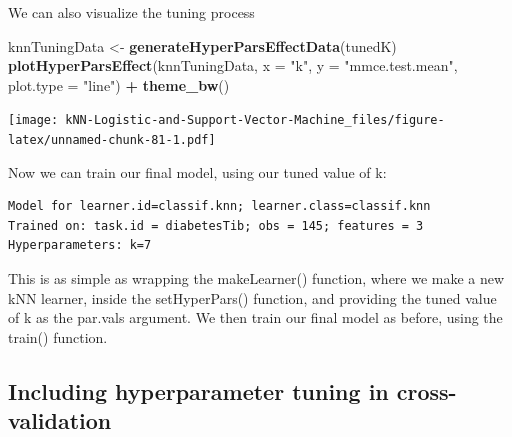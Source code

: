 \documentclass[
]{article}
\newenvironment{Shaded}{\begin{snugshade}}{\end{snugshade}}
\newcommand{\AttributeTok}[1]{\textcolor[rgb]{0.13,0.29,0.53}{#1}}
\newcommand{\FunctionTok}[1]{\textcolor[rgb]{0.13,0.29,0.53}{\textbf{#1}}}
\newcommand{\NormalTok}[1]{#1}
\newcommand{\OtherTok}[1]{\textcolor[rgb]{0.56,0.35,0.01}{#1}}
\newcommand{\SpecialCharTok}[1]{\textcolor[rgb]{0.81,0.36,0.00}{\textbf{#1}}}
\newcommand{\StringTok}[1]{\textcolor[rgb]{0.31,0.60,0.02}{#1}}
\begin{document}
We can also visualize the tuning process

\begin{Shaded}
\begin{Highlighting}[]
\NormalTok{knnTuningData }\OtherTok{\textless{}{-}} \FunctionTok{generateHyperParsEffectData}\NormalTok{(tunedK)}
\FunctionTok{plotHyperParsEffect}\NormalTok{(knnTuningData, }\AttributeTok{x =} \StringTok{"k"}\NormalTok{, }\AttributeTok{y =} \StringTok{"mmce.test.mean"}\NormalTok{,}
                    \AttributeTok{plot.type =} \StringTok{"line"}\NormalTok{) }\SpecialCharTok{+}
\FunctionTok{theme\_bw}\NormalTok{()}
\end{Highlighting}
\end{Shaded}

\texttt{[image: kNN-Logistic-and-Support-Vector-Machine\_files/figure-latex/unnamed-chunk-81-1.pdf]}

Now we can train our final model, using our tuned value of k:

\begin{Shaded}
\end{Shaded}

\begin{verbatim}
Model for learner.id=classif.knn; learner.class=classif.knn
Trained on: task.id = diabetesTib; obs = 145; features = 3
Hyperparameters: k=7
\end{verbatim}

This is as simple as wrapping the makeLearner() function, where we make
a new kNN learner, inside the setHyperPars() function, and providing the
tuned value of k as the par.vals argument. We then train our final model
as before, using the train() function.

\subsection{Including hyperparameter tuning in
cross-validation}\label{including-hyperparameter-tuning-in-cross-validation}
\end{document}
